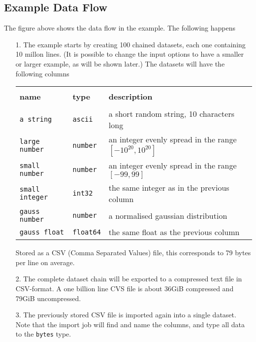 \documentclass[a4paper]{article}
\begin{document}
\subsection*{Example Data Flow}
The figure above shows the data flow in the example.  The following happens
\begin{enumerate}
\item[1.] The example starts by creating 100 chained datasets, each
  one containing 10 millon lines.  (It is possible to change the input
  options to have a smaller or larger example, as will be shown
  later.)  The datasets will have the following columns
  \begin{snugshade}
  \noindent\begin{tabular}{@{}p{3.0cm}p{2cm}p{8.5cm}}\hline\\[-1ex]
  \textbf{name} & \textbf{type} & \textbf{description}\\[1ex]
  \hline\\[-0.5ex]
  \texttt{a string}      & \texttt{ascii}   & a short random string, 10 characters long\\
  \texttt{large number}  & \texttt{number}  & an integer evenly spread in the range $[-10^{20}, 10^{20}]$ \\
  \texttt{small number}  & \texttt{number}  & an integer evenly spread in the range $[-99, 99]$\\
  \texttt{small integer} & \texttt{int32}   & the same integer as in the previous column\\
  \texttt{gauss number}  & \texttt{number}  & a normalised gaussian distribution\\
  \texttt{gauss float}   & \texttt{float64} & the same float as the previous column\\[1ex]
  \hline
  \end{tabular}
  \end{snugshade}
  Stored as a CSV (Comma Separated Values) file, this corresponds to
  79 bytes per line on average.
    
  \item[2.] The complete dataset chain will be exported to a
    compressed text file in CSV-format.  A one billion line CVS file
    is about 36GiB compressed and 79GiB uncompressed.
    
  \item[3.] The previously stored CSV file is imported again into a
    single dataset.  Note that the import job will find and name the
    columns, and type all data to the \texttt{bytes} type.


\end{enumerate}
\end{document}

